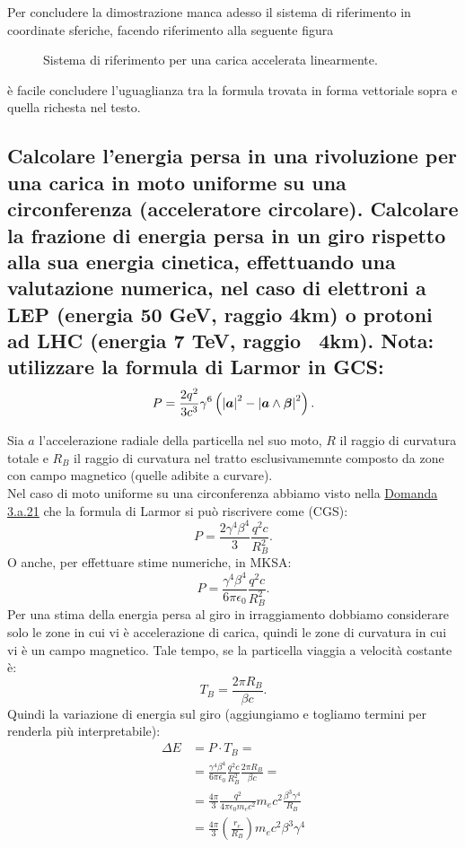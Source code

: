 Per concludere la dimostrazione manca adesso il sistema di riferimento in coordinate sferiche, facendo riferimento alla seguente figura
\begin{figure}[H]
    \centering
    \caption{Sistema di riferimento per una carica accelerata linearmente.}
    \label{fig:sistema-potenza-relativistica}
\end{figure}
è facile concludere l'uguaglianza tra la formula trovata in forma vettoriale sopra e quella richesta nel testo.



\subsection[]{Calcolare l’energia persa in una rivoluzione per una carica in moto uniforme su una circonferenza (acceleratore circolare). Calcolare la frazione di energia persa
in un giro rispetto alla sua energia cinetica, effettuando una valutazione numerica, nel caso di elettroni a LEP (energia 50 GeV, raggio 4km) o protoni ad LHC (energia 7 TeV, raggio ~4km). Nota: utilizzare la formula di Larmor in GCS:
\[
	P=\frac{2q^2}{3c^3}\gamma^{6}\left( \left| \boldsymbol{a} \right| ^2 - \left| \boldsymbol{a}\wedge \boldsymbol{\beta}  \right| ^2 \right) 
.\] }
\label{sec:3.b.21}
Sia $a$ l'accelerazione radiale della particella nel suo moto, $R$ il raggio di curvatura totale e $R_{B}$ il raggio di curvatura nel tratto esclusivamemnte composto da zone con campo magnetico (quelle adibite a curvare).\\
Nel caso di moto uniforme su una circonferenza abbiamo visto nella \hyperref[sec:3.a.21]{Domanda 3.a.21} che la formula di Larmor si può riscrivere come (CGS):
\[
	P = \frac{2\gamma^4\beta^4}{3}\frac{q^2c}{R_{B}^2}
.\] 
O anche, per effettuare stime numeriche, in MKSA:
\[
	P = \frac{\gamma^4\beta^4}{6\pi\epsilon_0}\frac{q^2c}{R_{B}^2}
.\] 
Per una stima della energia persa al giro in irraggiamento dobbiamo considerare solo le zone in cui vi è accelerazione di carica, quindi le zone di curvatura in cui vi è un campo magnetico. Tale tempo, se la particella viaggia a velocità costante è:
\[
	T_{B}= \frac{2\pi R_{B}}{\beta c}
.\] 
Quindi la variazione di energia sul giro (aggiungiamo e togliamo termini per renderla più interpretabile):
\begin{align*}
	\Delta E &= P\cdot T_{B}=\\
	&=  \frac{\gamma^4\beta^4}{6\pi\epsilon_0}\frac{q^2c}{R_{B}^2}\frac{2\pi R_{B}}{\beta c}=\\
	&=  \frac{4\pi }{3}\frac{q^2}{4\pi\epsilon_0m_e c^2} m_ec^2\frac{\beta^3\gamma^4}{R_B}\\
	&= \frac{4\pi}{3}\left( \frac{r_e}{R_B} \right) m_e c^2\beta^3\gamma^4 \\
\end{align*}	

